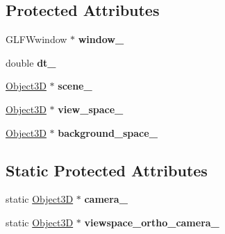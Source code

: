 \subsection*{Protected Attributes}
\begin{DoxyCompactItemize}
\item 
\hypertarget{class_simple_graphics_engine_a7bbb6493843a7b30884f0c48c59bd6e3}{G\-L\-F\-Wwindow $\ast$ {\bfseries window\-\_\-}}\label{class_simple_graphics_engine_a7bbb6493843a7b30884f0c48c59bd6e3}

\item 
\hypertarget{class_simple_graphics_engine_a708b8ca863a6a7392891b96ce7e6c8a7}{double {\bfseries dt\-\_\-}}\label{class_simple_graphics_engine_a708b8ca863a6a7392891b96ce7e6c8a7}

\item 
\hypertarget{class_simple_graphics_engine_a4c036f9c03e715abd96f42099aa51987}{\hyperlink{class_object3_d}{Object3\-D} $\ast$ {\bfseries scene\-\_\-}}\label{class_simple_graphics_engine_a4c036f9c03e715abd96f42099aa51987}

\item 
\hypertarget{class_simple_graphics_engine_accea36091bfe60bdc51b93a75fe3457f}{\hyperlink{class_object3_d}{Object3\-D} $\ast$ {\bfseries view\-\_\-space\-\_\-}}\label{class_simple_graphics_engine_accea36091bfe60bdc51b93a75fe3457f}

\item 
\hypertarget{class_simple_graphics_engine_a2e60ca17689db0c1c5fa1f101001d02d}{\hyperlink{class_object3_d}{Object3\-D} $\ast$ {\bfseries background\-\_\-space\-\_\-}}\label{class_simple_graphics_engine_a2e60ca17689db0c1c5fa1f101001d02d}

\end{DoxyCompactItemize}
\subsection*{Static Protected Attributes}
\begin{DoxyCompactItemize}
\item 
\hypertarget{class_simple_graphics_engine_ac3968ac3b92713c0411371183325dbcf}{static \hyperlink{class_object3_d}{Object3\-D} $\ast$ {\bfseries camera\-\_\-}}\label{class_simple_graphics_engine_ac3968ac3b92713c0411371183325dbcf}

\item 
\hypertarget{class_simple_graphics_engine_ae370a1e86596886e6f45fc6520b782fd}{static \hyperlink{class_object3_d}{Object3\-D} $\ast$ {\bfseries viewspace\-\_\-ortho\-\_\-camera\-\_\-}}\label{class_simple_graphics_engine_ae370a1e86596886e6f45fc6520b782fd}

\end{DoxyCompactItemize}


